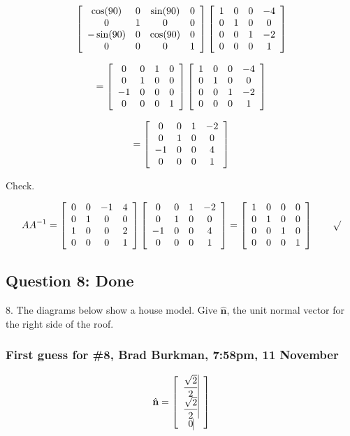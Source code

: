 \documentclass[11pt]{article}
\begin{document}
\begin{spacing}{1.2}
$$
\left[
	\begin{array}{cccc}
		\cos (90) & 0 & \sin (90) & 0 \cr
		0 & 1 & 0 & 0 \cr
		-\sin(90) & 0 & \cos (90) & 0 \cr
		0 & 0 & 0 & 1 \cr
	\end{array}
\right]
\left[
\begin{array}{cccc}
	1 & 0 & 0 & -4 \cr
	0 & 1 & 0 & 0 \cr
	0 & 0 & 1 & -2 \cr
	0 & 0 & 0 & 1 \cr
\end{array}
\right]
$$

$$= 
\left[
	\begin{array}{cccc}
		0 & 0 & 1 & 0 \cr
		0 & 1 & 0 & 0 \cr
		-1 & 0 & 0 & 0 \cr
		0 & 0 & 0 & 1 \cr
	\end{array}
\right]
\left[
\begin{array}{cccc}
	1 & 0 & 0 & -4 \cr
	0 & 1 & 0 & 0 \cr
	0 & 0 & 1 & -2 \cr
	0 & 0 & 0 & 1 \cr
\end{array}
\right]
$$

$$= 
\left[
	\begin{array}{cccc}
		0 & 0 & 1 & -2 \cr
		0 & 1 & 0 & 0 \cr
		-1 & 0 & 0 & 4 \cr
		0 & 0 & 0 & 1 \cr
	\end{array}
\right]
$$

Check.  

$$ A A^{-1} = \left[
	\begin{array}{cccc}
		0 & 0 & -1 & 4 \cr
		0 & 1 & 0 & 0 \cr
		1 & 0 & 0 & 2 \cr
		0 & 0 & 0 & 1 \cr
	\end{array}
\right]
\left[
	\begin{array}{cccc}
		0 & 0 & 1 & -2 \cr
		0 & 1 & 0 & 0 \cr
		-1 & 0 & 0 & 4 \cr
		0 & 0 & 0 & 1 \cr
	\end{array}
\right]
=
\left[
	\begin{array}{cccc}
		1 & 0 & 0 & 0 \cr
		0 & 1 & 0 & 0 \cr
		0 & 0 & 1 & 0 \cr
		0 & 0 & 0 & 1 \cr
	\end{array}
\right]
\qquad \surd
$$



\subsection{Question 8:  Done}
8.  The diagrams below show a house model.  Give $\hat{\mathbf{n}}$, the unit normal vector for the right side of the roof.  

\subsubsection{First guess for \#8, Brad Burkman, 7:58pm, 11 November}
$$\hat{\mathbf{n}} = 
\left[
\begin{array}{>{\displaystyle}c<{\vrule width 0pt height 24pt depth 8pt}}
	 \frac{\sqrt2}{2}\cr
	 \frac{\sqrt2}{2}\cr
	 0 
\end{array}
\right]
$$


\end{spacing}
\end{document}
